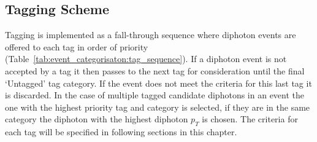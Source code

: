 \subsection{Tagging Scheme}
Tagging is implemented as a fall-through sequence where diphoton events are offered to each tag in order of priority (Table~\ref{tab:event_categorisaton:tag_sequence}). 
If a diphoton event is not accepted by a tag it then passes to the next tag for consideration until the final `Untagged' tag category. 
If the event does not meet the criteria for this last tag it is discarded.
In the case of multiple tagged candidate diphotons in an event the one with the highest priority tag and category is selected, if they are in the same category the diphoton with the highest diphoton $p_{T}$ is chosen.
The criteria for each tag will be specified in following sections in this chapter.
\begin{table}[h!]
    \centering
    \caption{The \Hgg tag sequence in order of tag priority from highest (top) to lowest (bottom).}
    \label{tab:event_categorisaton:tag_sequence}
\end{table}







